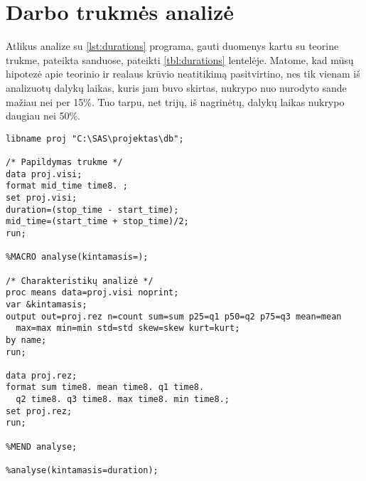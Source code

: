 \chapter{Darbo trukmės analizė}

Atlikus analize su \ref{lst:durations} programa, gauti duomenys kartu 
su teorine trukme, pateikta sanduose, pateikti \ref{tbl:durations} lentelėje.
Matome, kad mūsų hipotezė apie teorinio ir realaus krūvio neatitikimą
pasitvirtino, nes tik vienam iš analizuotų dalykų laikas, kuris jam buvo
skirtas, nukrypo nuo nurodyto sande mažiau nei per 15\%. Tuo tarpu,
net trijų, iš nagrinėtų, dalykų laikas nukrypo daugiau nei 50\%.

\begin{listing}[H]
  \begin{verbatim}
libname proj "C:\SAS\projektas\db";

/* Papildymas trukme */
data proj.visi;
format mid_time time8. ;
set proj.visi;
duration=(stop_time - start_time);
mid_time=(start_time + stop_time)/2;
run;

%MACRO analyse(kintamasis=);

/* Charakteristikų analizė */
proc means data=proj.visi noprint;
var &kintamasis;
output out=proj.rez n=count sum=sum p25=q1 p50=q2 p75=q3 mean=mean
  max=max min=min std=std skew=skew kurt=kurt;
by name;
run;

data proj.rez;
format sum time8. mean time8. q1 time8. 
  q2 time8. q3 time8. max time8. min time8.;
set proj.rez;
run;

%MEND analyse;

%analyse(kintamasis=duration);
  \end{verbatim}
  \caption{SAS programa naudota trukmės suskaičiavimui.}
  \label{lst:durations}
\end{listing}

